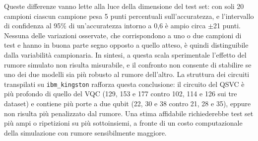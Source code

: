 Queste differenze vanno lette alla luce della dimensione del test set: con soli 20 campioni ciascun campione pesa 5 punti percentuali sull'accuratezza, e l'intervallo di confidenza al 95\% di un'accuratezza intorno a 0,6 è ampio circa $\pm$21 punti. Nessuna delle variazioni osservate, che corrispondono a uno o due campioni di test e hanno in buona parte segno opposto a quello atteso, è quindi distinguibile dalla variabilità campionaria. In sintesi, a questa scala sperimentale l'effetto del rumore simulato non risulta misurabile, e il confronto non consente di stabilire se uno dei due modelli sia più robusto al rumore dell'altro. La struttura dei circuiti transpilati su \texttt{ibm\_kingston} rafforza questa conclusione: il circuito del QSVC è più profondo di quello del VQC (129, 153 e 177 contro 102, 114 e 126 sui tre dataset) e contiene più porte a due qubit (22, 30 e 38 contro 21, 28 e 35), eppure non risulta più penalizzato dal rumore. Una stima affidabile richiederebbe test set più ampi o ripetizioni su più sottoinsiemi, a fronte di un costo computazionale della simulazione con rumore sensibilmente maggiore.

